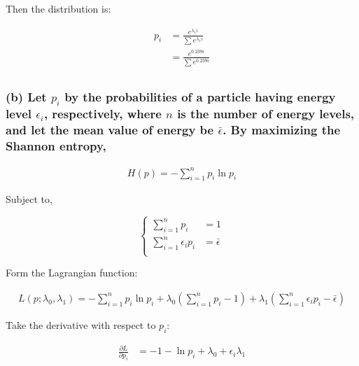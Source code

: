 Then the distribution is:

\[
\begin{aligned}
p_i&=\frac{e^{\lambda_1i}}{\sum e^{\lambda_1i}}\\
&=\frac{e^{0.239i}}{\sum e^{0.239i}}\\
\end{aligned}
\]

\hypertarget{b-let-p_i-by-the-probabilities-of-a-particle-having-energy-level-epsilon_i-respectively-where-n-is-the-number-of-energy-levels-and-let-the-mean-value-of-energy-be-barepsilon.-by-maximizing-the-shannon-entropy}{%
\subsubsection{\texorpdfstring{(b) Let \(p_i\) by the probabilities of a
particle having energy level \(\epsilon_i\), respectively, where \(n\)
is the number of energy levels, and let the mean value of energy be
\(\bar\epsilon\). By maximizing the Shannon
entropy,}{(b) Let p\_i by the probabilities of a particle having energy level \textbackslash epsilon\_i, respectively, where n is the number of energy levels, and let the mean value of energy be \textbackslash bar\textbackslash epsilon. By maximizing the Shannon entropy,}}\label{b-let-p_i-by-the-probabilities-of-a-particle-having-energy-level-epsilon_i-respectively-where-n-is-the-number-of-energy-levels-and-let-the-mean-value-of-energy-be-barepsilon.-by-maximizing-the-shannon-entropy}}

\[
\begin{aligned}
H(p)=-\sum_{i=1}^np_i\ln{p_i}
\end{aligned}
\]

Subject to,

\[
\begin{cases}
\sum_{i=1}^np_i&=1\\
\sum_{i=1}^n\epsilon_ip_i&=\bar\epsilon\\
\end{cases}
\]

Form the Lagrangian function:

\[
\begin{aligned}
L(p;\lambda_0,\lambda_1)=-\sum_{i=1}^np_i\ln{p_i}
+\lambda_0\left(\sum_{i=1}^np_i-1\right)+\lambda_1\left(\sum_{i=1}^n\epsilon_ip_i-\bar\epsilon\right)
\end{aligned}
\]

Take the derivative with respect to \(p_i\):

\[
\begin{aligned}
\frac{\partial L}{\partial p_i}
&=-1-\ln{p_i}+\lambda_0+\epsilon_i\lambda_1\\
\end{aligned}
\]

